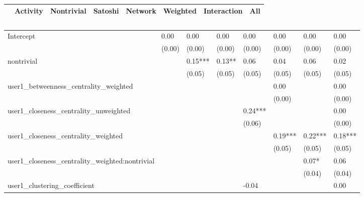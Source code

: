 \begin{table}
\caption{}
\begin{center}
\begin{tabular}{lccccccc}
\hline
                                               & Activity & Nontrivial & Satoshi & Network & Weighted & Interaction &   All    \\
\hline
\hline
\end{tabular}
\begin{tabular}{llllllll}
Intercept                                      & 0.00     & 0.00       & 0.00    & 0.00    & 0.00     & 0.00        & 0.00     \\
                                               & (0.00)   & (0.00)     & (0.00)  & (0.00)  & (0.00)   & (0.00)      & (0.00)   \\
nontrivial                                     &          & 0.15***    & 0.13**  & 0.06    & 0.04     & 0.06        & 0.02     \\
                                               &          & (0.05)     & (0.05)  & (0.05)  & (0.05)   & (0.05)      & (0.05)   \\
user1_betweenness_centrality_weighted          &          &            &         &         & 0.00     &             & 0.00     \\
                                               &          &            &         &         & (0.00)   &             & (0.00)   \\
user1_closeness_centrality_unweighted          &          &            &         & 0.24*** &          &             & 0.00     \\
                                               &          &            &         & (0.06)  &          &             & (0.00)   \\
user1_closeness_centrality_weighted            &          &            &         &         & 0.19***  & 0.22***     & 0.18***  \\
                                               &          &            &         &         & (0.05)   & (0.05)      & (0.05)   \\
user1_closeness_centrality_weighted:nontrivial &          &            &         &         &          & 0.07*       & 0.06     \\
                                               &          &            &         &         &          & (0.04)      & (0.04)   \\
user1_clustering_coefficient                   &          &            &         & -0.04   &          &             & 0.00     \\

\end{tabular}
\end{center}
\end{table}
